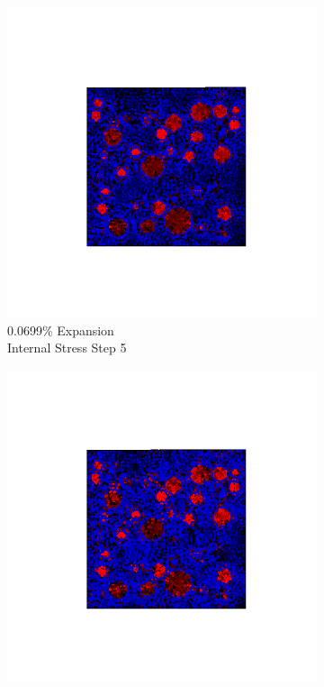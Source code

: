 \begin{figure}[ht!]
\centering
    \begin{subfigure}{.25\textwidth}
      \centering
      \includegraphics[width=1.0\linewidth]{Files/exp_3D/ASR/A15P75_1_s5.png}
      \caption{0.0699\% Expansion\\Internal Stress Step 5}
    \end{subfigure}%
    \begin{subfigure}{.25\textwidth}
      \centering
      \includegraphics[width=1.0\linewidth]{Files/exp_3D/ASR/A15P75_1_s10.png}

\end{subfigure}
\end{figure}

